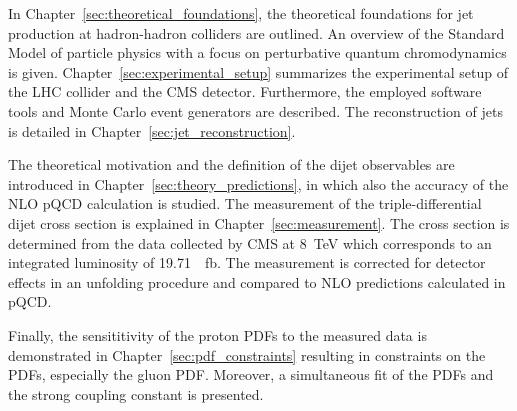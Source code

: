 In Chapter~\ref{sec:theoretical_foundations}, the theoretical foundations for
jet production at hadron-hadron colliders are outlined. An overview of the
Standard Model of particle physics with a focus on perturbative quantum
chromodynamics is given. Chapter~\ref{sec:experimental_setup} summarizes the
experimental setup of the LHC collider and the CMS detector. Furthermore, the
employed software tools and Monte Carlo event generators are described. The
reconstruction of jets is detailed in Chapter~\ref{sec:jet_reconstruction}.

The theoretical motivation and the definition of the dijet observables are
introduced in Chapter~\ref{sec:theory_predictions}, in which also the accuracy
of the NLO pQCD calculation is studied. The measurement of the
triple-differential dijet cross section is explained in
Chapter~\ref{sec:measurement}. The cross section is determined from the data
collected by CMS at \SI{8}{\TeV} which corresponds to an integrated luminosity
of \SI{19.71}{\per \femto \barn}. The measurement is corrected for detector
effects in an unfolding procedure and compared to NLO predictions calculated in
pQCD.

Finally, the sensititivity of the proton PDFs to the measured data is
demonstrated in Chapter~\ref{sec:pdf_constraints} resulting in constraints on
the PDFs, especially the gluon PDF. Moreover, a simultaneous fit of the PDFs and
the strong coupling constant is presented.
